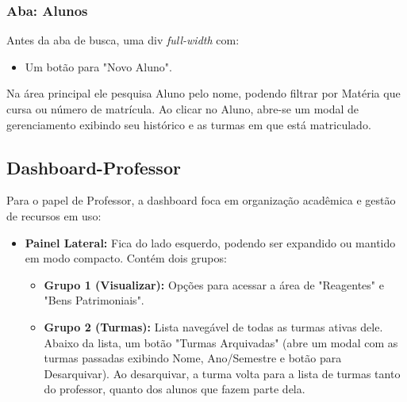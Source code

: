 \subsubsection{Aba: Alunos}
Antes da aba de busca, uma div \textit{full-width} com:
\begin{itemize}
    \item Um botão para "Novo Aluno".
\end{itemize}
Na área principal ele pesquisa Aluno pelo nome, podendo filtrar por Matéria que cursa ou número de matrícula. Ao clicar no Aluno, abre-se um modal de gerenciamento exibindo seu histórico e as turmas em que está matriculado.

\subsection{Dashboard-Professor}
Para o papel de Professor, a dashboard foca em organização acadêmica e gestão de recursos em uso:
\begin{itemize}
    \item \textbf{Painel Lateral:} Fica do lado esquerdo, podendo ser expandido ou mantido em modo compacto. Contém dois grupos:
    \begin{itemize}
        \item \textbf{Grupo 1 (Visualizar):} Opções para acessar a área de "Reagentes" e "Bens Patrimoniais".
        \item \textbf{Grupo 2 (Turmas):} Lista navegável de todas as turmas ativas dele. Abaixo da lista, um botão "Turmas Arquivadas" (abre um modal com as turmas passadas exibindo Nome, Ano/Semestre e botão para Desarquivar). Ao desarquivar, a turma volta para a lista de turmas tanto do professor, quanto dos alunos que fazem parte dela.
    \end{itemize}
\end{itemize}

